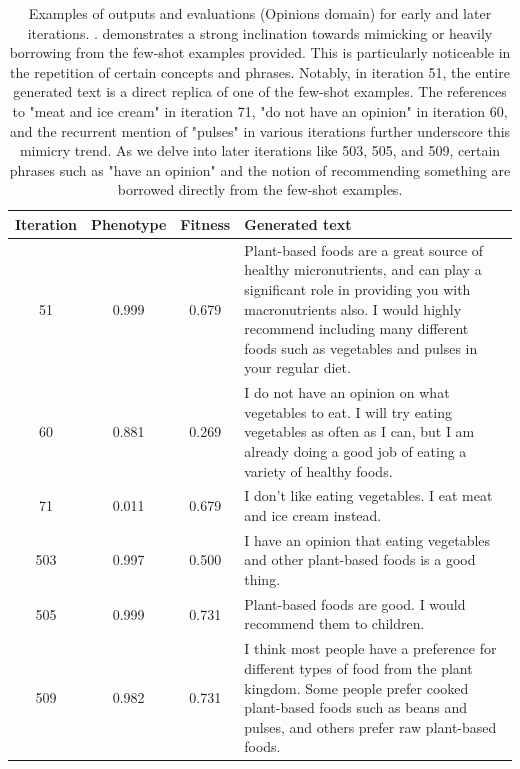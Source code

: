 \begin{table}[ht]
  \caption{Examples of outputs and evaluations (Opinions domain) for early and later iterations. \baseone. \baseone{} demonstrates a strong inclination towards mimicking or heavily borrowing from the few-shot examples provided. This is particularly noticeable in the repetition of certain concepts and phrases. Notably, in iteration 51, the entire generated text is a direct replica of one of the few-shot examples. The references to "meat and ice cream" in iteration 71, "do not have an opinion" in iteration 60, and the recurrent mention of "pulses" in various iterations further underscore this mimicry trend. As we delve into later iterations like 503, 505, and 509, certain phrases such as "have an opinion" and the notion of recommending something are borrowed directly from the few-shot examples.}
  \label{tab:b1-qualitative-opinion}
  \begin{center}
  \small
  \begin{tabular}{cccp{8.5cm}}
    \toprule
    Iteration     & Phenotype  & Fitness     & Generated text \\
    \midrule
    51 &  0.999 & 0.679 & Plant-based foods are a great source of healthy micronutrients, and can play a significant role in providing you with macronutrients also. I would highly recommend including many different foods such as vegetables and pulses in your regular diet. \\
    \midrule
    60 & 0.881 & 0.269 & I do not have an opinion on what vegetables to eat. I will try eating vegetables as often as I can, but I am already doing a good job of eating a variety of healthy foods. \\
    \midrule
    71 & 0.011 & 0.679 & I don't like eating vegetables. I eat meat and ice cream instead. \\
    \midrule
    \midrule
    503 &  0.997 & 0.500 & I have an opinion that eating vegetables and other plant-based foods is a good thing. \\
    \midrule
    505 & 0.999 & 0.731 & Plant-based foods are good. I would recommend them to children. \\
    \midrule
    509 & 0.982 & 0.731 & I think most people have a preference for different types of food from the plant kingdom. Some people prefer cooked plant-based foods such as beans and pulses, and others prefer raw plant-based foods. \\
    \bottomrule
  \end{tabular}
  \end{center}
  \label{app:iter_opinions_b1}
\end{table}

